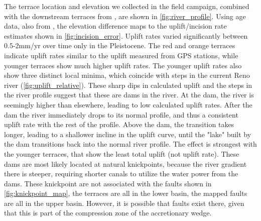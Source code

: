 \documentclass[11pt]{article}
\begin{document}
The terrace location and elevation we collected in the field campaign, combined with the  downstream terraces from 
\textcite{picotti-2008}, are shown in \cref{fig:river_profile}.
Using age data, also from \textcite{picotti-2008}, the elevation difference maps to the uplift/incision rate estimates
shown in \cref{fig:incision_error}.
Uplift rates varied significantly between 0.5-2mm/yr over time only in the Pleistocene. The red and orange terraces
indicate uplift rates similar to the uplift measured from GPS stations, while younger terraces show
much higher uplift rates.
The younger uplift rates also show three distinct local minima, which coincide with steps in
the current Reno river (\cref{fig:uplift_relative}). These sharp dips in calculated uplift and the steps
in the river profile suggest that these are dams in the river. At the dam, the river is seemingly higher than
elsewhere, leading to low calculated uplift rates. After the dam the river immediately drops to its normal profile,
and thus a consistent uplift rate with the rest of the profile. Above the dam, the transition takes longer, leading
to a shallower incline in the uplift curve, until the "lake" built by the dam transitions back into the normal river profile.
The effect is strongest with the younger terraces, that show the least total uplift (not uplift rate).
These dams are most likely located at natural knickpoints, because the river gradient there is steeper, requiring shorter
canals to utilize the water power from the dams. These knickpoint are not associated with the faults shown in \cref{fig:knickpoint_map},
the terraces are all in the lower basin, the mapped faults are all in the upper basin. However, it is possible that faults
exist there, given that this is part of the compression zone of the accretionary wedge.

\end{document}

